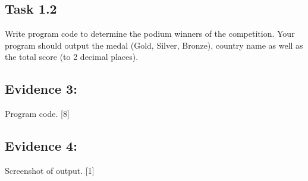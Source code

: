 \subsection*{Task 1.2 }

Write program code to determine the podium winners of the competition.
Your program should output the medal (Gold, Silver, Bronze), country
name as well as the total score (to 2 decimal places). 

\subsection*{Evidence 3: }

Program code. \hfill{}{[}8{]}

\subsection*{Evidence 4: }

Screenshot of output. \hfill{}{[}1{]}